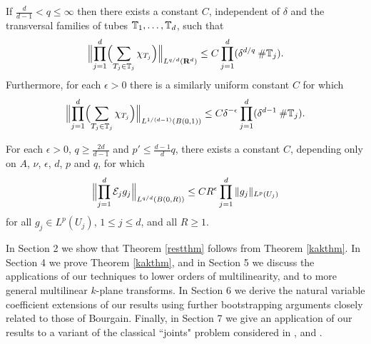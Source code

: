 \vspace{3mm}

\begin{theorem}\label{kakthm}
If $\tfrac{d}{d-1}< q\leq\infty$ then there exists a constant
$C$, independent of $\delta$ and the transversal families of tubes
${\mathbb{T}}_{1},\hdots,{\mathbb{T}}_{d}$, such that
\begin{equation*}
\Bigl\|\prod_{j=1}^{d}\Bigl(\sum_{T_{j}\in{\mathbb{T}}_{j}}\chi_{T_{j}}\Bigr)\Bigr\|_{L^{q/d}({\bf
R}^d)}\leq C\prod_{j=1}^{d}(\delta^{d/q}\: \mbox{\#}{\mathbb{T}}_{j}).
\end{equation*}
Furthermore, for each $\epsilon>0$ there is a similarly uniform constant $C$
for which
\begin{equation*}
\Bigl\|\prod_{j=1}^{d}\Bigl(\sum_{T_{j}\in{\mathbb{T}}_{j}}\chi_{T_{j}}\Bigr)\Bigr\|_{L^{1/(d-1)}(B(0,1))}\leq C\delta^{-\epsilon}\prod_{j=1}^{d}(\delta^{d-1}\: \mbox{\#}{\mathbb{T}}_{j}).
\end{equation*}
\end{theorem}

\vspace{3mm}

\begin{theorem}\label{restthm}
For each $\epsilon> 0$, $q\geq\tfrac{2d}{d-1}$ and
$p'\leq \tfrac{d-1}{d}q$, there exists a constant $C$,
depending only on $A$, $\nu$, $\epsilon$,
$d$, $p$ and $q$, for which
$$
\Bigl\|\prod_{j=1}^{d}{\mathcal{E}}_{j}g_{j}\Bigr\|_{L^{q/d}(B(0,R))}\leq C
R^{\epsilon}\prod_{j=1}^{d} \|g_{j}\|_{L^p(U_j)}
$$
for all $g_{j}\in L^p(U_j)$, $1\leq j\leq d$,
and all $R\geq 1$.
\end{theorem}

\vspace{3mm}

In Section 2 we show that Theorem \ref{restthm} follows from
Theorem \ref{kakthm}. In Section 4 we prove Theorem \ref{kakthm},
and in Section 5 we discuss the applications of our techniques to
lower orders of multilinearity, and to more general multilinear
$k$-plane transforms. In Section 6 we derive the natural variable
coefficient extensions of our results using further bootstrapping
arguments closely related to those of Bourgain. Finally, in Section
7 we give an application of our results to a variant of the
classical ``joints" problem considered in \cite{chaz}, \cite{sharir} and
\cite{feldman}.

